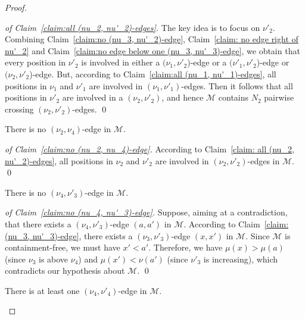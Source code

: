 \documentclass[a4paper]{llncs}
\begin{document}
\begin{proof}
  \begin{proof}[of Claim~\ref{claim:all (nu_2, nu'_2)-edges}]
    The key idea is to focus on $\nu'_2$.
    Combining Claim~\ref{claim:no (nu_3, nu'_2)-edge},
    Claim~\ref{claim: no edge right of nu'_2} and
    Claim~\ref{claim:no edge below one (nu_3, nu'_3)-edge},
    we obtain that every position in $\nu'_2$ is involved in
    either a $(\nu_1, \nu'_2$)-edge
    or a $(\nu'_1, \nu'_2$)-edge
    or $(\nu_2, \nu'_2$)-edge.
    But, according to Claim~\ref{claim:all (nu_1, nu'_1)-edges},
    all positions in $\nu_1$ and $\nu'_1$ are involved in
    $(\nu_1, \nu'_1)$-edges.
    Then it follows that
    all positions in $\nu'_2$ are involved in a $(\nu_2, \nu'_2)$,
    and hence
    $\mathcal{M}$ contains $N_2$ pairwise crossing $(\nu_2, \nu'_2)$-edges.
    \qed
  \end{proof}

  \begin{claim}
    \label{claim:no (nu_2, nu_4)-edge}
    There is no $(\nu_2, \nu_4)$-edge in $\mathcal{M}$.
  \end{claim}

  \begin{proof}[of Claim~\ref{claim:no (nu_2, nu_4)-edge}]
    According to Claim~\ref{claim: all (nu_2, nu'_2)-edges},
    all positions in $\nu_2$ and $\nu'_2$ are involved in
    $(\nu_2, \nu'_2)$-edges in $\mathcal{M}$.
    \qed
  \end{proof}

  \begin{claim}
    \label{claim:no (nu_4, nu'_3)-edge}
    There is no $(\nu_4, \nu'_3)$-edge in $\mathcal{M}$.
  \end{claim}

  \begin{proof}[of Claim~\ref{claim:no (nu_4, nu'_3)-edge}]
    Suppose, aiming at a contradiction, that there exists
    a $(\nu_4, \nu'_3)$-edge $(a, a')$ in $\mathcal{M}$.
    According to Claim~\ref{claim:(nu_3, nu'_3)-edge},
    there exists a $(\nu_3, \nu'_3)$-edge $(x, x')$
    in $\mathcal{M}$.
    Since $\mathcal{M}$ is containment-free, we must have
    $x' < a'$.
    Therefore,
    we have $\mu(x) > \mu(a)$ (since $\nu_3$ is above $\nu_4$) and
    $\mu(x') < \nu(a')$ (since $\nu'_3$ is increasing),
    which contradicts our hypothesis about $\mathcal{M}$.
    \qed
  \end{proof}

  \begin{claim}
    \label{claim:(nu_4, nu'_4)-edge}
    There is at least one $(\nu_4, \nu'_4)$-edge in $\mathcal{M}$.
  \end{claim}


\end{proof}
\end{document}
